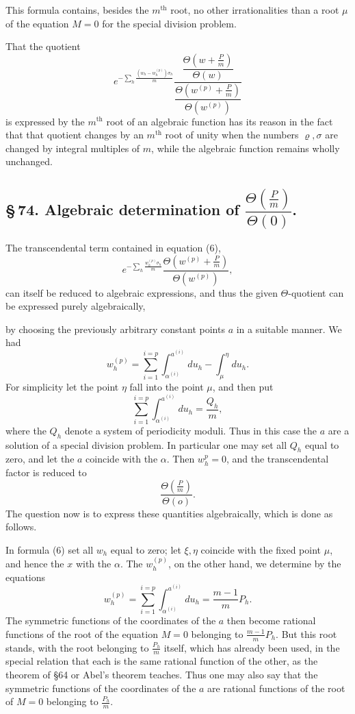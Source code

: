 \documentclass[10pt]{article}
\begin{document}
This formula contains, besides the \(m^{\text{th}}\) root, no other irrationalities than a root \(\mu\) of the equation \(M=0\) for the special division problem.

That the quotient
\[
e^{-\sum_h\frac{(w_h-w_h^{(p)})\sigma_h}{m}}
\frac{\dfrac{\Theta\left(w+\frac Pm\right)}{\Theta(w)}}
     {\dfrac{\Theta\left(w^{(p)}+\frac Pm\right)}{\Theta(w^{(p)})}}
\]
is expressed by the \(m^{\text{th}}\) root of an algebraic function has its reason in the fact that that quotient changes by an \(m^{\text{th}}\) root of unity when the numbers \(\varrho,\sigma\) are changed by integral multiples of \(m\), while the algebraic function remains wholly unchanged.

\subsection*{\S\,74. Algebraic determination of \(\dfrac{\Theta\left(\frac Pm\right)}{\Theta(0)}\).}

The transcendental term contained in equation (6),
\[
e^{-\sum_h\frac{w_h^{(p)}\sigma_h}{m}}
\frac{\Theta\left(w^{(p)}+\frac Pm\right)}{\Theta(w^{(p)})},
\]
can itself be reduced to algebraic expressions, and thus the given \(\Theta\)-quotient can be expressed purely algebraically,



by choosing the previously arbitrary constant points \(a\) in a suitable manner. We had
\[
w_h^{(p)}=\sum_{i=1}^{i=p}\int_{\alpha^{(i)}}^{a^{(i)}}du_h-\int_{\mu}^{\eta}du_h.
\]
For simplicity let the point \(\eta\) fall into the point \(\mu\), and then put
\[
\sum_{i=1}^{i=p}\int_{\alpha^{(i)}}^{a^{(i)}}du_h=\frac{Q_h}{m},
\]
where the \(Q_h\) denote a system of periodicity moduli. Thus in this case the \(a\) are a solution of a special division problem. In particular one may set all \(Q_h\) equal to zero, and let the \(a\) coincide with the \(\alpha\). Then \(w_h^{p}=0\), and the transcendental factor is reduced to
\[
\frac{\Theta\left(\frac Pm\right)}{\Theta(o)}.
\]
The question now is to express these quantities algebraically, which is done as follows.

In formula (6) set all \(w_h\) equal to zero; let \(\xi,\eta\) coincide with the fixed point \(\mu\), and hence the \(x\) with the \(\alpha\). The \(w_h^{(p)}\), on the other hand, we determine by the equations
\[
w_h^{(p)}=\sum_{i=1}^{i=p}\int_{\alpha^{(i)}}^{a^{(i)}}du_h
=\frac{m-1}{m}P_h.
\]
The symmetric functions of the coordinates of the \(a\) then become rational functions of the root of the equation \(M=0\) belonging to \(\frac{m-1}{m}P_h\). But this root stands, with the root belonging to \(\frac{P_h}{m}\) itself, which has already been used, in the special relation that each is the same rational function of the other, as the theorem of §64 or Abel's theorem teaches. Thus one may also say that the symmetric functions of the coordinates of the \(a\) are rational functions of the root of \(M=0\) belonging to \(\frac{P_h}{m}\).
\end{document}
